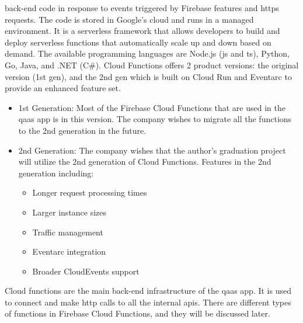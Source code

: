 \begin{multicols}{2}
\begin{itemize}
                  back-end code in response to events triggered by Firebase features and \acrshort{https} requests.
                  The code is stored in Google's cloud and runs in a managed environment. It is a serverless framework
                  that allows developers to build and deploy serverless functions that automatically scale up and down
                  based on demand. The available programming languages are Node.js (\acrshort{js} and \acrshort{ts}),
                  Python, Go, Java, and .NET (C\#). Cloud Functions offers 2 product versions: the original version
                  (1st gen), and the 2nd gen which is built on Cloud Run and Eventarc to provide an enhanced feature set.
                  \begin{itemize}
                        \item 1st Generation: Most of the Firebase Cloud Functions that are used in the \acrshort{qaas} app
                              is in this version. The company wishes to migrate all the functions to the 2nd generation in
                              the future.
                        \item 2nd Generation: The company wishes that the author's graduation project will utilize the 2nd
                              generation of Cloud Functions. Features in the 2nd generation including:
                              \begin{itemize}
                                    \item Longer request processing times
                                    \item Larger instance sizes
                                    \item Traffic management
                                    \item Eventarc integration
                                    \item Broader CloudEvents support
                              \end{itemize}
                  \end{itemize}
                  Cloud functions are the main back-end infrastructure of the \acrshort{qaas} app. It is used to connect
                  and make \acrshort{http} calls to all the internal \acrshort{api}s. There are different types of
                  functions in Firebase Cloud Functions, and they will be discussed later.
      \end{itemize}
\end{multicols}


